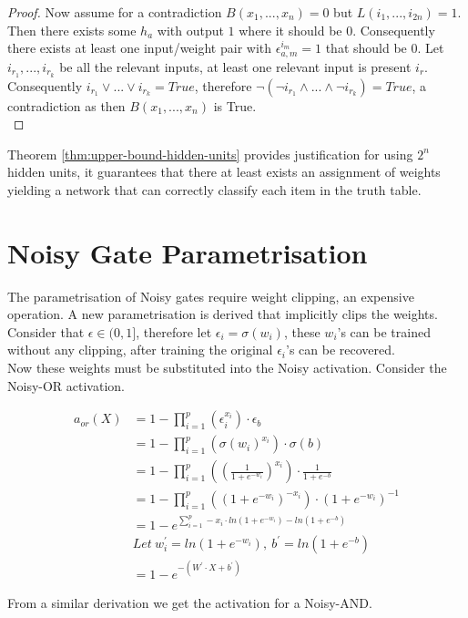 \begin{proof}
Now assume for a contradiction $B(x_1, ..., x_n) = 0$ but $L(i_1, ..., i_{2n}) = 1$. Then there exists some $h_a$ with output $1$ where it should be $0$. Consequently there exists at least one input/weight pair with $\epsilon_{a,m}^{i_m} = 1$ that should be $0$. Let $i_{r_1}, ..., i_{r_k}$ be all the relevant inputs, at least one relevant input is present $i_r$. Consequently $i_{r_1} \lor ... \lor i_{r_k} = True$, therefore $\lnot(\lnot i_{r_1} \land ... \land \lnot i_{r_k}) = True$, a contradiction as then $B(x_1, ..., x_n)$ is True.\\
\end{proof}

Theorem \ref{thm:upper-bound-hidden-units} provides justification for using $2^n$ hidden units, it guarantees that there at least exists an assignment of weights yielding a network that can correctly classify each item in the truth table.

\section{Noisy Gate Parametrisation} \label{sec:real-noisy-parametrisation}
The parametrisation of Noisy gates require weight clipping, an expensive operation. A new parametrisation is derived that implicitly clips the weights. Consider that $\epsilon \in (0, 1]$, therefore let $\epsilon_i = \sigma(w_i)$, these $w_i$'s can be trained without any clipping, after training the original $\epsilon_i$'s can be recovered.\\

Now these weights must be substituted into the Noisy activation. Consider the Noisy-OR activation.

\begin{align*}
a_{or}(X) &= 1 - \prod^p_{i=1}(\epsilon_i^{x_i}) \cdot \epsilon_b\\
&= 1 - \prod^p_{i=1}(\sigma(w_i)^{x_i}) \cdot \sigma(b)\\
&= 1 - \prod^p_{i=1}((\frac{1}{1 + e^{-w_i}})^{x_i}) \cdot \frac{1}{1 + e^{-b}}\\
&= 1 - \prod^p_{i=1}((1 + e^{-w_i})^{-x_i}) \cdot (1 + e^{-w_i})^{-1}\\
&= 1 - e^{\sum^p_{i=1} -x_i \cdot ln(1 + e^{-w_i}) - ln(1 + e^{-b})} \\
&Let\ w_i^{'} = ln(1 + e^{-w_i}),\ b^{'} = ln(1 + e^{-b})\\
&= 1 - e^{-(W^{'} \cdot X + b^{'})}
\end{align*}

From a similar derivation we get the activation for a Noisy-AND.

